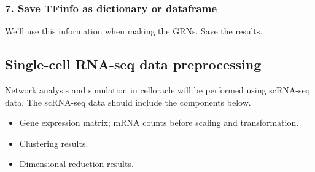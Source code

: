 \documentclass[letterpaper,10pt,english]{sphinxmanual}
\begin{document}
\subsubsection{7. Save TFinfo as dictionary or dataframe}
\label{\detokenize{notebooks/02_motif_scan/02_atac_peaks_to_TFinfo_with_celloracle_190901:7.-Save-TFinfo-as-dictionary-or-dataframe}}
We’ll use this information when making the GRNs. Save the results.

{
\begin{sphinxVerbatim}[commandchars=\\\{\}]
\llap{\color{nbsphinxin}[21]:\,\hspace{\fboxrule}\hspace{\fboxsep}}  
 

  
  

  
 
\end{sphinxVerbatim}
}


\subsection{Single-cell RNA-seq data preprocessing}
\label{\detokenize{tutorials/scrnaprocess:single-cell-rna-seq-data-preprocessing}}\label{\detokenize{tutorials/scrnaprocess:scrnaprocess}}\label{\detokenize{tutorials/scrnaprocess::doc}}
Network analysis and simulation in celloracle will be performed using scRNA-seq data. The scRNA-seq data should include the components below.
\begin{itemize}
\item {} 
Gene expression matrix; mRNA counts before scaling and transformation.

\item {} 
Clustering results.

\item {} 
Dimensional reduction results.

\end{itemize}
\end{document}
